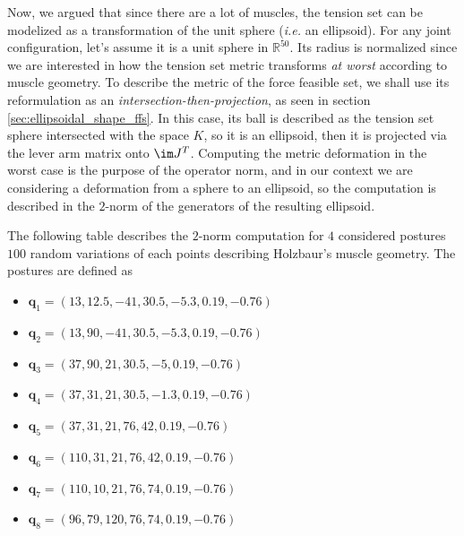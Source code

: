 Now, we argued that since there are a lot of muscles, the tension set can be modelized as a transformation of the unit sphere (\emph{i.e.} an ellipsoid). For any joint configuration, let's assume it is a unit sphere in $\mathbb{R}^{50}$. Its radius is normalized since we are interested in how the tension set metric transforms \emph{at worst} according to muscle geometry. To describe the metric of the force feasible set, we shall use its reformulation as an \emph{intersection-then-projection}, as seen in section \ref{sec:ellipsoidal_shape_ffs}. In this case, its ball is described as the tension set sphere intersected with the space $K$, so it is an ellipsoid, then it is projected via the lever arm matrix onto $\im J^T$. Computing the metric deformation in the worst case is the purpose of the operator norm, and in our context we are considering a deformation from a sphere to an ellipsoid, so the computation is described in the $2$-norm of the generators of the resulting ellipsoid.

The following table describes the $2$-norm computation for $4$ considered postures $100$ random variations of each points describing Holzbaur's muscle geometry. The postures are defined as 
\begin{itemize}[noitemsep]
    \item {$\mathbf{q}_1 = (13,12.5,-41,30.5,-5.3,0.19,-0.76)$}
    \item {$\mathbf{q}_2 = (13,90,-41,30.5,-5.3,0.19,-0.76)$}
    \item {$\mathbf{q}_3 = (37,90,21,30.5,-5,0.19,-0.76)$}
    \item {$\mathbf{q}_4 = (37,31,21,30.5,-1.3,0.19,-0.76)$}
    \item {$\mathbf{q}_5 = (37,31,21,76,42,0.19,-0.76)$}
    \item {$\mathbf{q}_6 = (110,31,21,76,42,0.19,-0.76)$}
    \item {$\mathbf{q}_7 = (110,10,21,76,74,0.19,-0.76)$}
    \item {$\mathbf{q}_8 = (96,79,120,76,74,0.19,-0.76)$}
\end{itemize}

